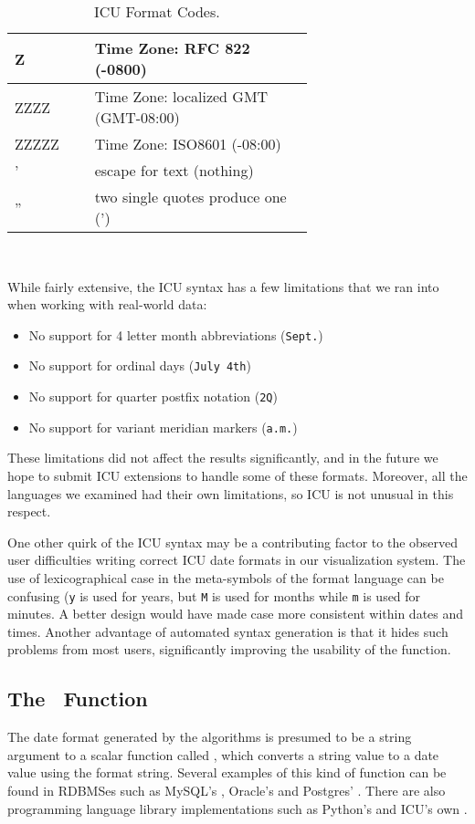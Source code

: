 \begin{table}[ht]
\begin{tabular}{|p{0.15\linewidth}| p{0.5\linewidth}|}
\scriptsize{Z} & \scriptsize{Time Zone: RFC 822 (-0800)}\\ \hline
\scriptsize{ZZZZ} & \scriptsize{Time Zone: localized GMT (GMT-08:00)}\\ \hline
\scriptsize{ZZZZZ} & \scriptsize{Time Zone: ISO8601 (-08:00)}\\ \hline
    
\scriptsize{'} & \scriptsize{escape for text (nothing)}\\ \hline
\scriptsize{''} & \scriptsize{two single quotes produce one (')}\\ \hline

\end{tabular}
\egroup
\label{tab:icuformats} \\
\caption{ICU Format Codes.}
\end{table}

While fairly extensive, the ICU syntax has a few limitations that we ran into when working with real-world data:

\begin{itemize}
\setlength\itemsep{0em}
\item No support for 4 letter month abbreviations (\eg \texttt{Sept.})
\item No support for ordinal days (\eg \texttt{July 4th})
\item No support for quarter postfix notation (\eg \texttt{2Q})
\item No support for variant meridian markers (\eg \texttt{a.m.})
\end{itemize}

These limitations did not affect the results significantly, and in the future we hope to submit ICU extensions to handle some of these formats. Moreover, all the languages we examined had their own limitations, so ICU is not unusual in this respect.

One other quirk of the ICU syntax may be a contributing factor to the observed user difficulties writing correct ICU date formats in our visualization system. The use of lexicographical case in the meta-symbols of the format language can be confusing (\eg \texttt{y} is used for years, but \texttt{M} is used for months while \texttt{m} is used for minutes. A better design would have made case more consistent within dates and times. Another advantage of automated syntax generation is that it hides such problems from most users, significantly improving the usability of the function.

\subsection{The \dateparse\ Function}

The date format generated by the algorithms is presumed to be a string argument to a scalar function called \dateparse, which converts a string value to a date value using the format string. Several examples of this kind of function can be found in RDBMSes such as MySQL's , Oracle's  and Postgres' . There are also programming language library implementations such as Python's  and ICU's own .
